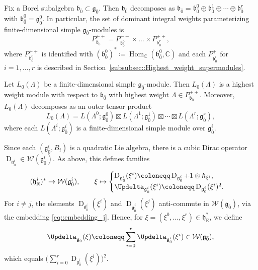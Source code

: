 \documentclass[11pt]{amsart}
\newcommand{\Hom}{\operatorname{Hom}}
\newcommand{\Dirac}{\operatorname{D}}
\def\WW{{\mathcal{W}}}
\def\CC{{\mathbb C}}
\def\RR{{\mathbb R}}
\def\hh{{\mathfrak h}}
\def\bb{{\mathfrak b}}
\def\even{{\mathfrak{g}_{\bar{0}}}}
\def\gg{{\mathfrak{g}}}
\theoremstyle{plain}
\theoremstyle{remark}
\theoremstyle{definition}
\numberwithin{equation}{section}
\theoremstyle{remark}
\begin{document}
Fix a Borel subalgebra $\bb_{\bar{0}}\subset\even$.
Then $\bb_{\bar{0}}$ decomposes as
$
\bb_{\bar{0}}=\bb_{\bar{0}}^{0}\oplus\bb_{\bar{0}}^{1}\oplus\cdots\oplus\bb_{\bar{0}}^{r}
$ with $\bb_{\bar{0}}^{0}=\gg_{\bar{0}}^{0}$.
In particular, the set of dominant integral weights parameterizing finite-dimensional simple $\even$-modules is
\begin{equation}
P^{++}_{\bb_{\bar{0}}}
=P^{++}_{\bb_{\bar{0}}^{0}}\times
\ldots \times 
P^{++}_{\bb_{\bar{0}}^{r}},
\end{equation}
where $P_{\bb_{\bar{0}}^{0}}^{++}$ is identified with $(\bb_{\bar{0}}^{0})^{\ast}\coloneqq \Hom_{\CC}(\bb_{\bar{0}}^{0},\CC)$ and each $P_{\bb_{\bar{0}}^{i}}^{+}$ for $i=1,\ldots, r$ is described in Section~\ref{subsubsec::Highest_weight_supermodules}.

Let $L_{0}(\Lambda)$ be a finite-dimensional simple $\even$-module.
Then $L_{0}(\Lambda)$ is a highest weight module with respect to $\bb_{\bar{0}}$ with highest weight $\Lambda \in P_{\bb_{\bar{0}}}^{++}$.
Moreover, $L_{0}(\Lambda)$ decomposes as an outer tensor product
\begin{equation}
L_{0}(\Lambda)
=
L(\Lambda^{0};\gg_{\bar{0}}^{0})\boxtimes L(\Lambda^{1};\gg_{\bar{0}}^{1})
\boxtimes
\cdots
\boxtimes
L(\Lambda^{r};\gg_{\bar{0}}^{r}),
\end{equation}
where each $L(\Lambda^{i};\gg_{\bar{0}}^{i})$ is a finite-dimensional simple module over
$\gg_{\bar{0}}^{i}$.

Since each $(\gg_{\bar 0}^{i},B_{i})$ is a quadratic Lie algebra, there is a cubic Dirac operator $\Dirac_{\gg_{\bar 0}^{i}}\in\WW(\gg_{\bar 0}^{i})$. As above, this defines families
\begin{equation}
(\hh^{i}_{\RR})^{\ast}\to\mathcal{W}(\gg_{\bar 0}^{i}),\qquad
\xi\mapsto
\begin{cases}
\Dirac_{\gg_{\bar 0}^{i}}(\xi^{i})\coloneqq \Dirac_{\gg_{\bar 0}^{i}}+1\otimes h_{\xi^{i}},\\
\Updelta_{\gg_{\bar 0}^{i}}(\xi^{i})\coloneqq \Dirac_{\gg_{\bar 0}^{i}}(\xi^{i})^{2}.
\end{cases}
\end{equation}
For $i\neq j$, the elements $\Dirac_{\gg_{\bar 0}^{i}}(\xi^{i})$ and $\Dirac_{\gg_{\bar 0}^{j}}(\xi^{j})$ anti-commute in $\WW(\even)$, via the embedding \eqref{eq::embedding_j}.
Hence, for $\xi=(\xi^{0},\ldots,\xi^{r})\in\hh_{\RR}^{\ast}$, we define
\begin{equation}
\Updelta_{\even}(\xi)\coloneqq \sum_{i=0}^{r}\Updelta_{\gg_{\bar 0}^{i}}(\xi^{i})\in\WW(\even),
\end{equation}
which equals $\bigl(\sum_{i=0}^{r}\Dirac_{\gg_{\bar 0}^{i}}(\xi^{i})\bigr)^{2}$. 
\end{document}
